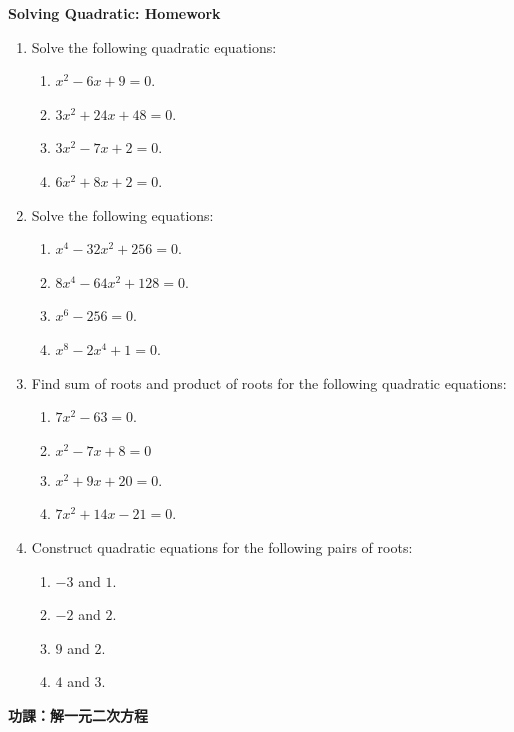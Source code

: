 \documentclass[12pt]{article}
\begin{document}
    \begin{center}
        \textbf{Solving Quadratic: Homework}
    \end{center}

    \begin{enumerate}
        \item Solve the following quadratic equations:\begin{enumerate}
            \item $x^2-6x+9=0$.
            \item $3x^2+24x+48=0$.
            \item $3x^2-7x+2=0$.
            \item $6x^2+8x+2=0$.
        \end{enumerate}
        \item Solve the following equations:\begin{enumerate}
            \item $x^4-32x^2+256=0$.
            \item $8x^4-64x^2+128=0$.
            \item $x^6-256=0$.
            \item $x^8-2x^4+1=0$.
        \end{enumerate}
        \item Find sum of roots and product of roots for the following quadratic equations:\begin{enumerate}
            \item $7x^2-63=0$.
            \item $x^2-7x+8=0$
            \item $x^2+9x+20=0$.
            \item $7x^2+14x-21=0$.
        \end{enumerate}
        \item Construct quadratic equations for the following pairs of roots:\begin{enumerate}
            \item $-3$ and $1$.
            \item $-2$ and $2$.
            \item $9$ and $2$.
            \item $4$ and $3$.
        \end{enumerate}
    \end{enumerate}

    \newpage

    \begin{center}
        \textbf{功課：解一元二次方程}
    \end{center}
\end{document}
